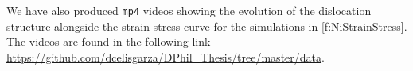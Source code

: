 We have also produced \texttt{mp4} videos showing the evolution of the dislocation structure alongside the strain-stress curve for the simulations in \cref{f:NiStrainStress}. The videos are found in the following link \href{https://github.com/dcelisgarza/DPhil_Thesis/tree/master/data}{https://github.com/dcelisgarza/DPhil\_Thesis/tree/master/data}.




